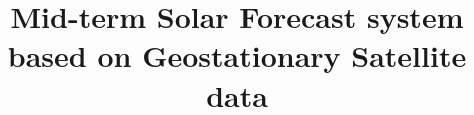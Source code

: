 \documentclass[conference]{IEEEtran}
\begin{document}
%
\title{Mid-term Solar Forecast system based on Geostationary Satellite data}
%
%
\end{document}
